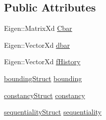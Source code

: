 \subsection*{\-Public \-Attributes}
\begin{DoxyCompactItemize}
\item 
\-Eigen\-::\-Matrix\-Xd \hyperlink{structShapeConstraintsStruct_ad3e432f9654bd72f28a2dbc146f39aa8}{\-Cbar}
\item 
\-Eigen\-::\-Vector\-Xd \hyperlink{structShapeConstraintsStruct_a8fe2cb4e246df55160e577e690fd1147}{dbar}
\item 
\-Eigen\-::\-Vector\-Xd \hyperlink{structShapeConstraintsStruct_a019f2dc8e024954a9413e0a5c5be9864}{f\-History}
\item 
\hyperlink{structShapeConstraintsStruct_1_1boundingStruct}{bounding\-Struct} \hyperlink{structShapeConstraintsStruct_a54e87c1a5d3df7ca724c4c8437a74ac8}{bounding}
\item 
\hyperlink{structShapeConstraintsStruct_1_1constancyStruct}{constancy\-Struct} \hyperlink{structShapeConstraintsStruct_ab0dfcbbac3869f0464e81facc50a0950}{constancy}
\item 
\hyperlink{structShapeConstraintsStruct_1_1sequentialityStruct}{sequentiality\-Struct} \hyperlink{structShapeConstraintsStruct_ab21948647937089aa8f72ddb8d1536b2}{sequentiality}
\end{DoxyCompactItemize}


